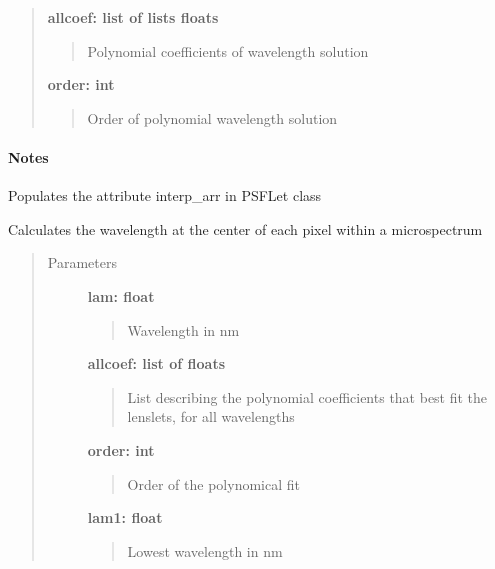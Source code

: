 \documentclass[letterpaper,10pt,english]{sphinxmanual}
\begin{document}
\begin{fulllineitems}
\begin{fulllineitems}
\begin{quote}
\begin{description}
\textbf{allcoef: list of lists floats}
\begin{quote}

Polynomial coefficients of wavelength solution
\end{quote}

\textbf{order: int}
\begin{quote}

Order of polynomial wavelength solution
\end{quote}

\end{description}\end{quote}
\paragraph{Notes}

Populates the attribute interp\_arr in PSFLet class

\end{fulllineitems}


\begin{fulllineitems}
\label{tools:tools.locate_psflets.PSFLets.genpixsol}
Calculates the wavelength at the center of each pixel within a microspectrum
\begin{quote}\begin{description}
\item[{Parameters}] \leavevmode
\textbf{lam: float}
\begin{quote}

Wavelength in nm
\end{quote}

\textbf{allcoef: list of floats}
\begin{quote}

List describing the polynomial coefficients that best fit the lenslets,
for all wavelengths
\end{quote}

\textbf{order: int}
\begin{quote}

Order of the polynomical fit
\end{quote}

\textbf{lam1: float}
\begin{quote}

Lowest wavelength in nm
\end{quote}


\end{description}
\end{quote}
\end{fulllineitems}
\end{fulllineitems}
\end{document}
